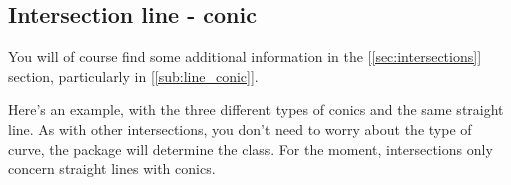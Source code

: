 

\subsection{Intersection line - conic} %
\label{sub:intersection_line_conic}

You will of course find some additional information in the [\ref{sec:intersections}] section, particularly in [\ref{sub:line_conic}].

Here's an example, with the three different types of conics and the same straight line. As with other intersections, you don't need to worry about the type of curve, the package will determine the class. For the moment, intersections only concern straight lines with conics.

